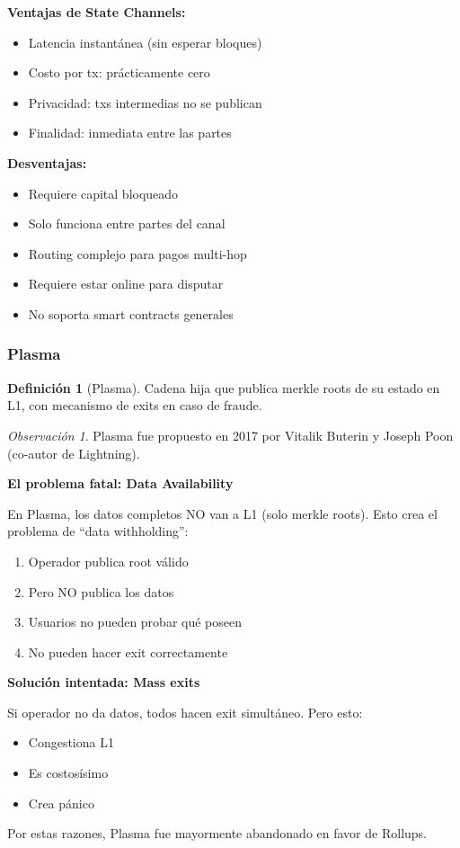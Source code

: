 \documentclass[11pt,a4paper,twoside,openright]{book}
\theoremstyle{definition}
\newtheorem{definition}{Definición}[chapter]
\theoremstyle{plain}
\theoremstyle{remark}
\newtheorem{remark}{Observación}[chapter]
\begin{document}
\begin{keyidea}
\textbf{Ventajas de State Channels:}
\begin{itemize}
    \item Latencia instantánea (sin esperar bloques)
    \item Costo por tx: prácticamente cero
    \item Privacidad: txs intermedias no se publican
    \item Finalidad: inmediata entre las partes
\end{itemize}

\textbf{Desventajas:}
\begin{itemize}
    \item Requiere capital bloqueado
    \item Solo funciona entre partes del canal
    \item Routing complejo para pagos multi-hop
    \item Requiere estar online para disputar
    \item No soporta smart contracts generales
\end{itemize}
\end{keyidea}

\subsubsection{Plasma}

\begin{definition}[Plasma]
Cadena hija que publica merkle roots de su estado en L1, con mecanismo de exits en caso de fraude.
\end{definition}

\begin{remark}
Plasma fue propuesto en 2017 por Vitalik Buterin y Joseph Poon (co-autor de Lightning).

\textbf{El problema fatal: Data Availability}

En Plasma, los datos completos NO van a L1 (solo merkle roots). Esto crea el problema de ``data withholding'':
\begin{enumerate}
    \item Operador publica root válido
    \item Pero NO publica los datos
    \item Usuarios no pueden probar qué poseen
    \item No pueden hacer exit correctamente
\end{enumerate}

\textbf{Solución intentada: Mass exits}

Si operador no da datos, todos hacen exit simultáneo. Pero esto:
\begin{itemize}
    \item Congestiona L1
    \item Es costosísimo
    \item Crea pánico
\end{itemize}

Por estas razones, Plasma fue mayormente abandonado en favor de Rollups.
\end{remark}
\end{document}
